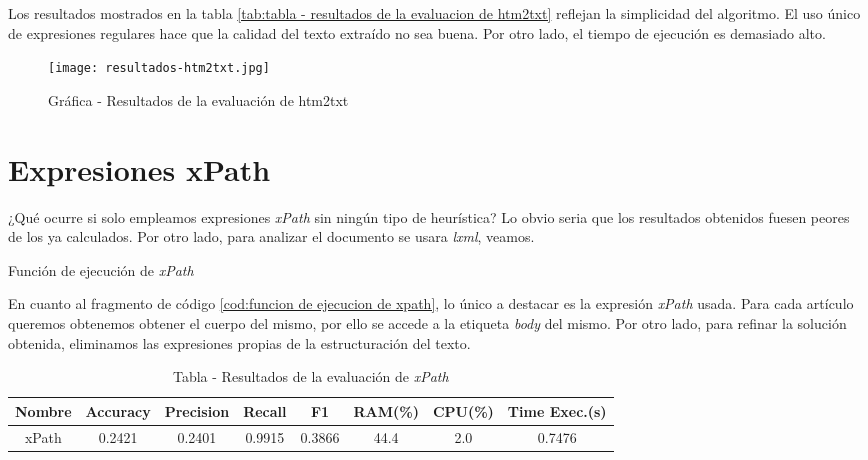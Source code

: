 Los resultados mostrados en la tabla \ref{tab:tabla - resultados de la evaluacion de htm2txt} reflejan la
simplicidad del algoritmo. El uso único de expresiones regulares hace que la calidad del texto extraído
no sea buena. Por otro lado, el tiempo de ejecución es demasiado alto.

\begin{figure}[tphb]
    \centering
    \texttt{[image: resultados-htm2txt.jpg]}
    \caption{Gráfica - Resultados de la evaluación de htm2txt}
    \label{img:grafica - resultados de la evaluacion de htm2txt}
\end{figure}

\section*{Expresiones xPath}

¿Qué ocurre si solo empleamos expresiones \emph{xPath} sin ningún tipo de heurística? Lo obvio seria que
los resultados obtenidos fuesen peores de los ya calculados. Por otro lado, para analizar el documento se 
usara \emph{lxml}, veamos.

\begin{codefloat}
    
    \caption{Función de ejecución de \emph{xPath}}
    \label{cod:funcion de ejecucion de xpath}
\end{codefloat}

En cuanto al fragmento de código \ref{cod:funcion de ejecucion de xpath}, lo único a destacar es la expresión
\emph{xPath} usada. Para cada artículo queremos obtenemos obtener el cuerpo del mismo, por ello se accede
a la etiqueta \emph{body} del mismo. Por otro lado, para refinar la solución obtenida, eliminamos las
expresiones propias de la estructuración del texto.

\begin{table}[h]
    \begin{center}
      \begin{tabular}{| c | c | c | c | c | c | c | c |} \hline 
       \textbf{Nombre} & \textbf{Accuracy} & \textbf{Precision}  & \textbf{Recall} & \textbf{F1} & \textbf{RAM(\%)} & \textbf{CPU(\%)} & \textbf{Time Exec.(s)} \\ \hline
       xPath & 0.2421 & 0.2401 & 0.9915 & 0.3866 & 44.4 & 2.0 & 0.7476 \\ \hline
      \end{tabular}
      \caption{Tabla - Resultados de la evaluación de \emph{xPath}}
      \label{tab:tabla - resultados de la evaluacion de xpath}
    \end{center}
\end{table}

